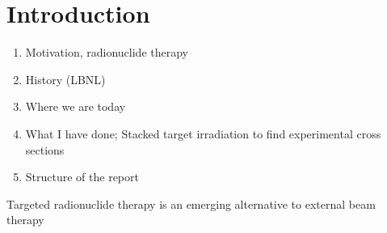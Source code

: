 
\chapter{Introduction}\label{Chapter:Introduction}
\noindent




\noindent

\begin{enumerate}
    \item Motivation, radionuclide therapy
    \item History (LBNL)
    \item Where we are today 
    \item What I have done; Stacked target irradiation to find experimental cross sections
    \item Structure of the report
\end{enumerate}

Targeted radionuclide therapy is an emerging alternative to external beam therapy

